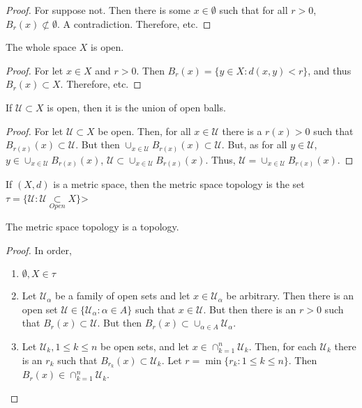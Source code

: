 \documentclass[crop=false,class=article,oneside]{standalone}
\begin{document}
            \begin{proof}
            For suppose not. Then there is some $x\in \emptyset$ such that for all $r>0$, $B_{r}(x)\not\subset \emptyset$. A contradiction. Therefore, etc.
            \end{proof}
            \begin{theorem}
            The whole space $X$ is open.
            \end{theorem}
            \begin{proof}
            For let $x\in X$ and $r>0$. Then $B_{r}(x) = \{y\in X:d(x,y)<r\}$, and thus $B_{r}(x)\subset X$. Therefore, etc.
            \end{proof}
            \begin{theorem}
            If $\mathcal{U}\subset X$ is open, then it is the union of open balls.
            \end{theorem}
            \begin{proof}
            For let $\mathcal{U} \subset X$ be open. Then, for all $x\in \mathcal{U}$ there is a $r(x)>0$ such that $B_{r(x)}(x) \subset \mathcal{U}$. But then $\cup_{x\in \mathcal{U}}B_{r(x)}(x)\subset \mathcal{U}$. But, as for all $y\in \mathcal{U}$, $y\in \cup_{x\in \mathcal{U}}B_{r(x)}(x)$, $\mathcal{U} \subset \cup_{x\in \mathcal{U}}B_{r(x)}(x)$. Thus, $\mathcal{U}= \cup_{x\in \mathcal{U}}B_{r(x)}(x)$.
            \end{proof}
            \begin{definition}
            If $(X,d)$ is a metric space, then the metric space topology is the set $\tau = \{\mathcal{U}:\mathcal{U}\underset{Open}\subset X\}$>
            \end{definition}
            \begin{theorem}
            The metric space topology is a topology.
            \end{theorem}
            \begin{proof}
            In order,
            \begin{enumerate}
            \item $\emptyset, X \in \tau$
            \item Let $\mathcal{U}_{\alpha}$ be a family of open sets and let $x\in \mathcal{U}_{\alpha}$ be arbitrary. Then there is an open set $\mathcal{U} \in \{\mathcal{U}_{\alpha}:\alpha\in A\}$ such that $x\in \mathcal{U}$. But then there is an $r>0$ such that $B_{r}(x)\subset\mathcal{U}$. But then $B_{r}(x) \subset \cup_{\alpha \in A}\mathcal{U}_{\alpha}$.
            \item Let $\mathcal{U}_{k}, 1\leq k \leq n$ be open sets, and let $x\in \cap_{k=1}^{n} \mathcal{U}_k$. Then, for each $\mathcal{U}_k$ there is an $r_{k}$ such that $B_{r_k}(x)\subset \mathcal{U}_{k}$. Let $r = \min\{r_k:1\leq k \leq n\}$. Then $B_{r}(x) \in \cap_{k=1}^{n}\mathcal{U}_k$.
            \end{enumerate}
            \end{proof}
\end{document}
